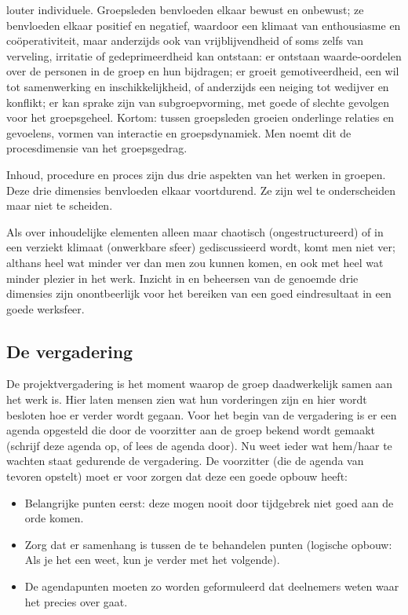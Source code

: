 \begin{enumerate}
     louter individuele. Groepsleden be{\ii}nvloeden elkaar bewust
     en onbewust; ze be{\ii}nvloeden elkaar positief en negatief,
     waardoor een klimaat van enthousiasme en co\"operativiteit,
     maar anderzijds ook van vrijblijvendheid of soms zelfs
     van verveling, irritatie of gedeprimeerdheid kan ontstaan: er ontstaan
     waarde-oordelen over de personen in de groep en hun bijdragen; er groeit gemotiveerdheid, een wil tot samenwerking en inschikkelijkheid, of anderzijds een neiging tot
     wedijver en konflikt; er kan sprake zijn van subgroepvorming, met goede of slechte gevolgen voor het
     groepsgeheel.
     Kortom: tussen groepsleden groeien onderlinge relaties en
     gevoelens, vormen van interactie en groepsdynamiek.
     Men noemt dit de procesdimensie van het groepsgedrag.
\end{enumerate}


Inhoud, procedure en proces zijn dus drie aspekten van het
werken in groepen. Deze drie dimensies be{\ii}nvloeden elkaar
voortdurend. Ze zijn wel te onderscheiden maar niet te scheiden.

     Als over inhoudelijke elementen alleen maar chaotisch
     (ongestructureerd) of in een verziekt klimaat (onwerkbare
     sfeer) gediscussieerd wordt, komt men niet ver; althans
     heel wat minder ver dan men zou kunnen komen, en ook met
     heel wat minder plezier in het werk.
     Inzicht in en beheersen van de genoemde drie dimensies
     zijn onontbeerlijk voor het bereiken van een goed eindresultaat in een goede werksfeer.

\subsection{De vergadering}

De projektvergadering is het moment waarop de groep daadwerkelijk samen aan het werk is. Hier laten mensen zien wat hun
vorderingen zijn en hier wordt besloten hoe er verder wordt
gegaan.
Voor het begin van de vergadering is er een agenda opgesteld 
die door de voorzitter aan de groep bekend wordt gemaakt
(schrijf deze agenda op, of lees de agenda door). Nu weet
ieder wat hem/haar te wachten staat gedurende de vergadering.
De voorzitter (die de agenda van tevoren opstelt) moet er voor
zorgen dat deze een goede opbouw heeft:
\begin{itemize}
\item
     Belangrijke punten eerst: deze mogen nooit door tijdgebrek niet goed aan de orde komen.
\item
     Zorg dat er samenhang is tussen de te behandelen punten
     (logische opbouw: Als je het een weet, kun je verder met
     het volgende).
\item
     De agendapunten moeten zo worden geformuleerd dat deelnemers weten waar het precies over gaat.
\end{itemize}

